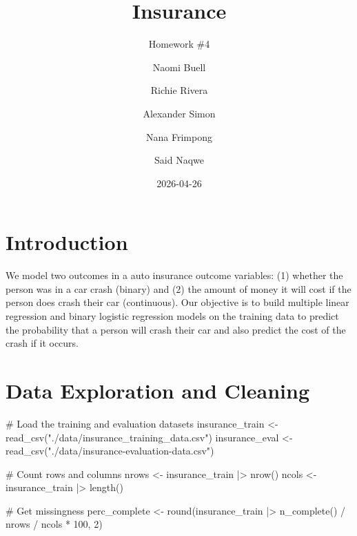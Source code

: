 \documentclass[
  11pt]{article}
\title{Insurance}
\subtitle{Homework \#4}
\author{Naomi Buell \and Richie Rivera \and Alexander Simon \and Nana
Frimpong \and Said Naqwe}
\date{2026-04-26}
\newenvironment{Shaded}{\begin{snugshade}}{\end{snugshade}}
\newcommand{\CommentTok}[1]{\textcolor[rgb]{0.37,0.37,0.37}{#1}}
\newcommand{\DecValTok}[1]{\textcolor[rgb]{0.68,0.00,0.00}{#1}}
\newcommand{\FunctionTok}[1]{\textcolor[rgb]{0.28,0.35,0.67}{#1}}
\newcommand{\NormalTok}[1]{\textcolor[rgb]{0.00,0.23,0.31}{#1}}
\newcommand{\OtherTok}[1]{\textcolor[rgb]{0.00,0.23,0.31}{#1}}
\newcommand{\SpecialCharTok}[1]{\textcolor[rgb]{0.37,0.37,0.37}{#1}}
\newcommand{\StringTok}[1]{\textcolor[rgb]{0.13,0.47,0.30}{#1}}
\begin{document}
\maketitle


\section{Introduction}\label{introduction}

We model two outcomes in a auto insurance outcome variables: (1) whether
the person was in a car crash (binary) and (2) the amount of money it
will cost if the person does crash their car (continuous). Our objective
is to build multiple linear regression and binary logistic regression
models on the training data to predict the probability that a person
will crash their car and also predict the cost of the crash if it
occurs.

\section{Data Exploration and
Cleaning}\label{data-exploration-and-cleaning}

\begin{Shaded}
\begin{Highlighting}[]
\CommentTok{\# Load the training and evaluation datasets}
\NormalTok{insurance\_train }\OtherTok{\textless{}{-}} \FunctionTok{read\_csv}\NormalTok{(}\StringTok{"./data/insurance\_training\_data.csv"}\NormalTok{)}
\NormalTok{insurance\_eval }\OtherTok{\textless{}{-}} \FunctionTok{read\_csv}\NormalTok{(}\StringTok{"./data/insurance{-}evaluation{-}data.csv"}\NormalTok{)}

\CommentTok{\# Count rows and columns}
\NormalTok{nrows }\OtherTok{\textless{}{-}}\NormalTok{ insurance\_train }\SpecialCharTok{|\textgreater{}} \FunctionTok{nrow}\NormalTok{()}
\NormalTok{ncols }\OtherTok{\textless{}{-}}\NormalTok{ insurance\_train }\SpecialCharTok{|\textgreater{}} \FunctionTok{length}\NormalTok{()}

\CommentTok{\# Get missingness}
\NormalTok{perc\_complete }\OtherTok{\textless{}{-}} \FunctionTok{round}\NormalTok{(insurance\_train }\SpecialCharTok{|\textgreater{}} \FunctionTok{n\_complete}\NormalTok{() }\SpecialCharTok{/}\NormalTok{ nrows }\SpecialCharTok{/}\NormalTok{ ncols }\SpecialCharTok{*} \DecValTok{100}\NormalTok{, }\DecValTok{2}\NormalTok{)}
\end{Highlighting}
\end{Shaded}
\end{document}
